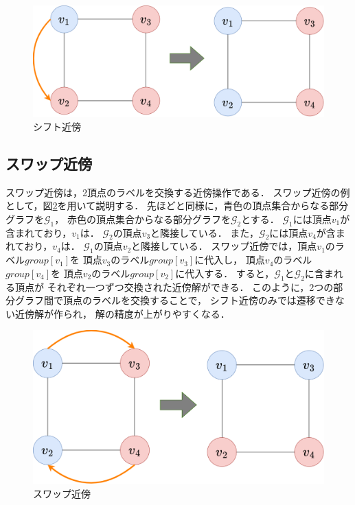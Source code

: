 \begin{figure}[htbp]
  \centering
  \includegraphics[scale=0.2]{img/shift-neighbor.png}
  \caption{シフト近傍}
  \label{shift-neighbor}
\end{figure}

\subsection{スワップ近傍}

スワップ近傍は，2頂点のラベルを交換する近傍操作である．
スワップ近傍の例として，図\ref{swap-neighbor}を用いて説明する．
先ほどと同様に，青色の頂点集合からなる部分グラフを$\mathcal{G}_1$，
赤色の頂点集合からなる部分グラフを$\mathcal{G}_2$とする．
$\mathcal{G}_1$には頂点$v_1$が含まれており，$v_1$は．
$\mathcal{G}_2$の頂点$v_3$と隣接している．
また，$\mathcal{G}_2$には頂点$v_4$が含まれており，$v_4$は．
$\mathcal{G}_1$の頂点$v_2$と隣接している．
スワップ近傍では，頂点$v_1$のラベル$group[v_1]$を
頂点$v_3$のラベル$group[v_3]$に代入し，
頂点$v_4$のラベル$group[v_4]$を
頂点$v_2$のラベル$group[v_2]$に代入する．
すると，$\mathcal{G}_1$と$\mathcal{G}_2$に含まれる頂点が
それぞれ一つずつ交換された近傍解ができる．
このように，2つの部分グラフ間で頂点のラベルを交換することで，
シフト近傍のみでは遷移できない近傍解が作られ，
解の精度が上がりやすくなる．

\begin{figure}[htbp]
  \centering
  \includegraphics[scale=0.2]{img/swap-neighbor.png}
  \caption{スワップ近傍}
  \label{swap-neighbor}
\end{figure}

